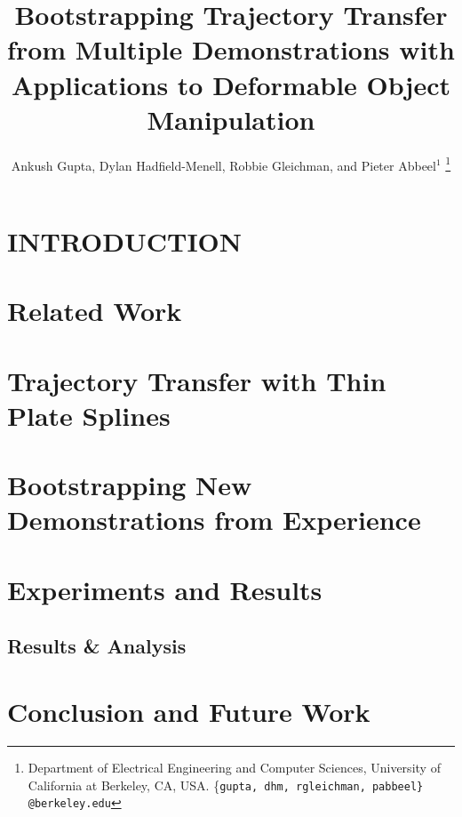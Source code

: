 \documentclass[letterpaper, 10 pt, conference]{ieeeconf}  %
\title{\LARGE \bf
Bootstrapping Trajectory Transfer from Multiple Demonstrations with Applications to Deformable Object Manipulation
}
\author{Ankush Gupta, Dylan Hadfield-Menell, Robbie Gleichman, and Pieter Abbeel$^{1}$%
\thanks{Department of Electrical Engineering and Computer Sciences, University of California at Berkeley, CA, USA.
  \{\tt\small gupta, dhm, rgleichman, pabbeel\} @berkeley.edu}}
\begin{document}

\maketitle
\thispagestyle{empty}
\pagestyle{empty}


\begin{abstract}

\end{abstract}


\section{INTRODUCTION}

\section{Related Work}


\section{Trajectory Transfer with Thin Plate Splines}


\section{Bootstrapping New Demonstrations from Experience}


\section{Experiments and Results}

\subsection{Results \& Analysis}


\section{Conclusion and Future Work}


\addtolength{\textheight}{-12cm}   %
\end{document}
